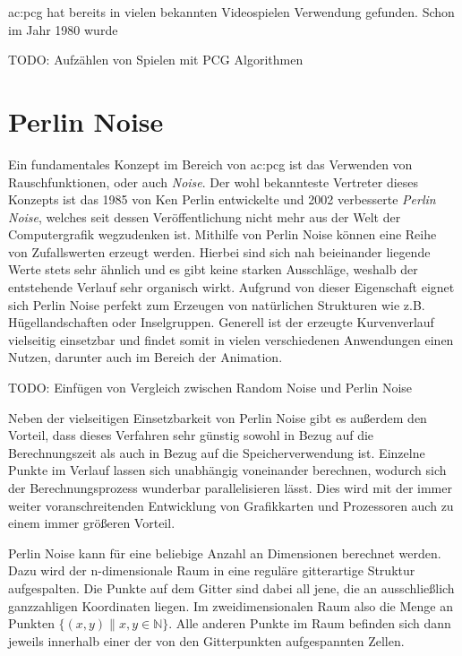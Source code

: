 \gls{ac:pcg} hat bereits in vielen bekannten Videospielen Verwendung gefunden. Schon im Jahr 1980 wurde %

TODO: Aufzählen von Spielen mit PCG Algorithmen

\section{Perlin Noise}
Ein fundamentales Konzept im Bereich von \gls{ac:pcg} ist das Verwenden von Rauschfunktionen, oder auch \textit{Noise}.
Der wohl bekannteste Vertreter dieses Konzepts ist das 1985 von Ken Perlin entwickelte \cite{16_perlin} und 2002 verbesserte \cite{18_perlin}
\textit{Perlin Noise}, welches seit dessen Veröffentlichung nicht mehr aus der Welt der Computergrafik wegzudenken ist. Mithilfe von
Perlin Noise können eine Reihe von Zufallswerten erzeugt werden. Hierbei sind sich nah beieinander liegende Werte stets sehr ähnlich und es
gibt keine starken Ausschläge, weshalb der entstehende Verlauf sehr organisch wirkt. Aufgrund von dieser Eigenschaft eignet sich Perlin Noise
perfekt zum Erzeugen von natürlichen Strukturen wie z.B. Hügellandschaften oder Inselgruppen. Generell ist der erzeugte Kurvenverlauf vielseitig
einsetzbar und findet somit in vielen verschiedenen Anwendungen einen Nutzen, darunter auch im Bereich der Animation. \cite{17_lagae_et_al}

TODO: Einfügen von Vergleich zwischen Random Noise und Perlin Noise

Neben der vielseitigen Einsetzbarkeit von Perlin Noise gibt es außerdem den Vorteil, dass dieses Verfahren sehr günstig sowohl in Bezug auf
die Berechnungszeit als auch in Bezug auf die Speicherverwendung ist. Einzelne Punkte im Verlauf lassen sich unabhängig voneinander berechnen,
wodurch sich der Berechnungsprozess wunderbar parallelisieren lässt. Dies wird mit der immer weiter voranschreitenden Entwicklung von
Grafikkarten und Prozessoren auch zu einem immer größeren Vorteil. \cite{17_lagae_et_al}

Perlin Noise kann für eine beliebige Anzahl an Dimensionen berechnet werden. Dazu wird der n-dimensionale Raum in eine reguläre gitterartige
Struktur aufgespalten. Die Punkte auf dem Gitter sind dabei all jene, die an ausschließlich ganzzahligen Koordinaten liegen. Im zweidimensionalen
Raum also die Menge an Punkten \(\{(x, y) \| x, y \in \mathbb{N}\}\). Alle anderen Punkte im Raum befinden sich dann jeweils innerhalb
einer der von den Gitterpunkten aufgespannten Zellen.

